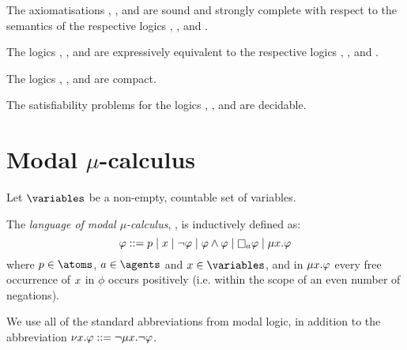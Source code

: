 \begin{proposition}
The axiomatisations \axiomAmlK{}, \axiomAmlKFF{}, and \axiomAmlS{} are sound and strongly complete with respect to the semantics of the respective logics \logicAmlK{}, \logicAmlKFF{}, and \logicAmlS{}.
\end{proposition}

\begin{proposition}
The logics \logicAmlK{}, \logicAmlKFF{}, and \logicAmlS{} are expressively equivalent to the respective logics \logicK{}, \logicKFF{}, and \logicS{}.
\end{proposition}

\begin{proposition}
The logics \logicAmlK{}, \logicAmlKFF{}, and \logicAmlS{} are compact.
\end{proposition}

\begin{proposition}
The satisfiability problems for the logics \logicAmlK{}, \logicAmlKFF{}, and \logicAmlS{} are decidable.
\end{proposition}

\section{Modal $\mu$-calculus}\label{mu}

Let $\variables$ be a non-empty, countable set of variables.

\begin{definition}
The {\em language of modal $\mu$-calculus}, \langMu{}, is inductively defined as:
$$
\phi ::= 
    \atomP \mid
    \varX \mid
    \lnot \phi \mid
    \phi \land \phi \mid
    \necessaryA \phi \mid
    \lfpX \phi
$$
where $\atomP \in \atoms$, $\agentA \in \agents$ and $\varX \in \variables$, and in $\mu {x} . \varphi$ every free occurrence of $x$ in $\phi$ occurs positively (i.e. within the scope of an even number of negations).
\end{definition}

We use all of the standard abbreviations from modal logic, in addition to the abbreviation $\nu {x} . \varphi ::= \lnot \mu {x} . \lnot \varphi$.

